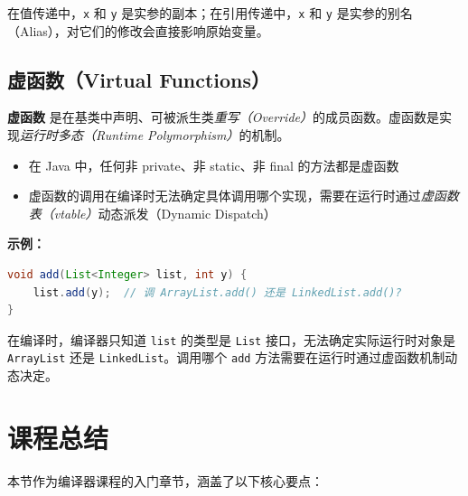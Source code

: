 \documentclass[12pt,a4paper]{ctexart}
\newcommand{\term}[1]{\textbf{\textcolor{mainblue}{#1}}}
\begin{document}
\vspace{0.5em}
在值传递中，\texttt{x} 和 \texttt{y} 是实参的副本；在引用传递中，\texttt{x} 和 \texttt{y} 是实参的别名（Alias），对它们的修改会直接影响原始变量。

\subsection{虚函数（Virtual Functions）}

\begin{keybox}
  \term{虚函数} 是在基类中声明、可被派生类\emph{重写（Override）}的成员函数。虚函数是实现\emph{运行时多态（Runtime Polymorphism）}的机制。
\end{keybox}

\begin{itemize}[itemsep=0.2em]
  \item 在 Java 中，任何非 private、非 static、非 final 的方法都是虚函数
  \item 虚函数的调用在编译时无法确定具体调用哪个实现，需要在运行时通过\emph{虚函数表（vtable）}动态派发（Dynamic Dispatch）
\end{itemize}

\textbf{示例：}

\begin{lstlisting}[language=Java]
void add(List<Integer> list, int y) {
    list.add(y);  // 调 ArrayList.add() 还是 LinkedList.add()?
}
\end{lstlisting}

在编译时，编译器只知道 \texttt{list} 的类型是 \texttt{List} 接口，无法确定实际运行时对象是 \texttt{ArrayList} 还是 \texttt{LinkedList}。调用哪个 \texttt{add} 方法需要在运行时通过虚函数机制动态决定。

\newpage

\section{课程总结}

本节作为编译器课程的入门章节，涵盖了以下核心要点：
\end{document}
